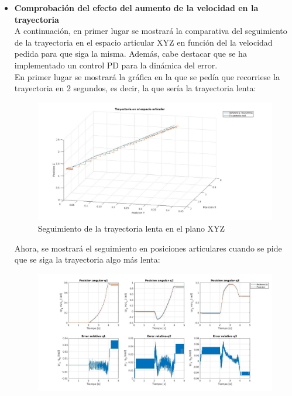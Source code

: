 \begin{itemize}

	\item \textbf{Comprobación del efecto del aumento de la velocidad en la trayectoria} \\

	A continuación, en primer lugar se mostrará la comparativa del seguimiento de la trayectoria en el espacio articular XYZ en función del la velocidad pedida para que siga la misma. Además, cabe destacar que se ha implementado un control PD para la dinámica del error.\\

	En primer lugar se mostrará la gráfica en la que se pedía que recorriese la trayectoria en 2 segundos, es decir, la que sería la trayectoria lenta:



	\begin{figure}[h!]

		\centering

		\includegraphics[width=.8\textwidth]{exp4_trayPDidealSR_lento}

		\caption{Seguimiento de la trayectoria lenta en el plano XYZ}

	\end{figure}



	Ahora, se mostrará el seguimiento en posiciones articulares cuando se pide que se siga la trayectoria algo más lenta:



	\begin{figure}[h!]

		\centering

		\includegraphics[width=.8\textwidth]{exp4_posPDidealSR_lento}


\end{figure}
\end{itemize}
